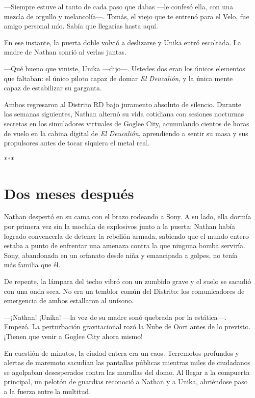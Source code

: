 \documentclass[11pt,twoside]{book}
\begin{document}
---Siempre estuve al tanto de cada paso que dabas ---le confesó ella, con una mezcla de orgullo y melancolía---. Tomás, el viejo que te entrenó para el Velo, fue amigo personal mío. Sabía que llegarías hasta aquí.

En ese instante, la puerta doble volvió a deslizarse y Unika entró escoltada. La madre de Nathan sonrió al verlas juntas.

---Qué bueno que viniste, Unika ---dijo---. Ustedes dos eran los únicos elementos que faltaban: el único piloto capaz de domar \textit{El Deucalión}, y la única mente capaz de estabilizar su garganta.

Ambos regresaron al Distrito RD bajo juramento absoluto de silencio. Durante las semanas siguientes, Nathan alternó su vida cotidiana con sesiones nocturnas secretas en los simuladores virtuales de Goglee City, acumulando cientos de horas de vuelo en la cabina digital de \textit{El Deucalión}, aprendiendo a sentir su masa y sus propulsores antes de tocar siquiera el metal real.

***

\section*{Dos meses después}

Nathan despertó en su cama con el brazo rodeando a Sony. A su lado, ella dormía por primera vez sin la mochila de explosivos junto a la puerta; Nathan había logrado convencerla de detener la rebelión armada, sabiendo que el mundo entero estaba a punto de enfrentar una amenaza contra la que ninguna bomba serviría. Sony, abandonada en un orfanato desde niña y emancipada a golpes, no tenía más familia que él.

De repente, la lámpara del techo vibró con un zumbido grave y el suelo se sacudió con una onda seca. No era un temblor común del Distrito: los comunicadores de emergencia de ambos estallaron al unísono.

---¡Nathan! ¡Unika! ---la voz de su madre sonó quebrada por la estática---. Empezó. La perturbación gravitacional rozó la Nube de Oort antes de lo previsto. ¡Tienen que venir a Goglee City ahora mismo!

En cuestión de minutos, la ciudad entera era un caos. Terremotos profundos y alertas de maremoto sacudían las pantallas públicas mientras miles de ciudadanos se agolpaban desesperados contra las murallas del domo. Al llegar a la compuerta principal, un pelotón de guardias reconoció a Nathan y a Unika, abriéndose paso a la fuerza entre la multitud.
\end{document}
